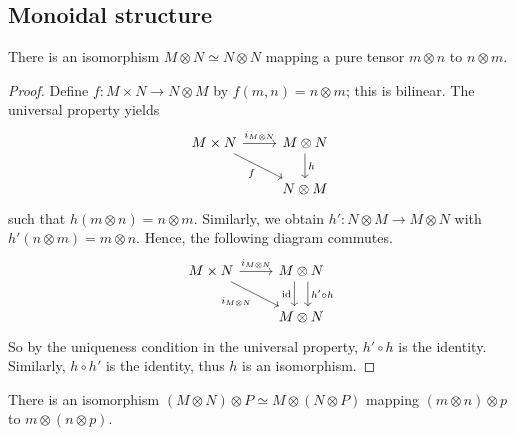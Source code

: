 \subsection{Monoidal structure}
\begin{proposition}[commutativity]
    There is an isomorphism \( M \otimes N \simeq N \otimes N \) mapping a pure tensor \( m \otimes n \) to \( n \otimes m \).
\end{proposition}
\begin{proof}
    Define \( f : M \times N \to N \otimes M \) by \( f(m, n) = n \otimes m \); this is bilinear.
    The universal property yields
    \[\begin{tikzcd}
        {M \times N} & {M \otimes N} \\
        & {N \otimes M}
        \arrow["{i_{M \otimes N}}", from=1-1, to=1-2]
        \arrow["h", from=1-2, to=2-2]
        \arrow["f"', from=1-1, to=2-2]
    \end{tikzcd}\]
    such that \( h(m \otimes n) = n \otimes m \).
    Similarly, we obtain \( h' : N \otimes M \to M \otimes N \) with \( h'(n \otimes m) = m \otimes n \).
    Hence, the following diagram commutes.
    \[\begin{tikzcd}
        {M \times N} & {M \otimes N} \\
        & {M \otimes N}
        \arrow["{i_{M \otimes N}}", from=1-1, to=1-2]
        \arrow["{h' \circ h}", shift left=2, from=1-2, to=2-2]
        \arrow["\id"', shift right=2, from=1-2, to=2-2]
        \arrow["{i_{M \otimes N}}"', from=1-1, to=2-2]
    \end{tikzcd}\]
    So by the uniqueness condition in the universal property, \( h' \circ h \) is the identity.
    Similarly, \( h \circ h' \) is the identity, thus \( h \) is an isomorphism.
\end{proof}
\begin{proposition}[associativity]
    There is an isomorphism \( (M \otimes N) \otimes P \simeq M \otimes (N \otimes P) \) mapping \( (m \otimes n) \otimes p \) to \( m \otimes (n \otimes p) \).
\end{proposition}
